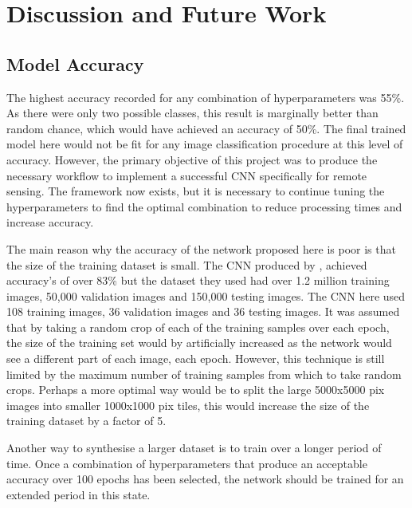 \chapter{Discussion and Future Work}

\section{Model Accuracy}
The highest accuracy recorded for any combination of hyperparameters was 55\%. As there were only two possible classes, this result is marginally better than random chance, which would have achieved an accuracy of 50\%. The final trained model here would not be fit for any image classification procedure at this level of accuracy. However, the primary objective of this project was to produce the necessary workflow to implement a successful CNN specifically for remote sensing. The framework now exists, but it is necessary to continue tuning the hyperparameters to find the optimal combination to reduce processing times and increase accuracy. 
\par
The main reason why the accuracy of the network proposed here is poor is that the size of the training dataset is small. The CNN produced by \citet{krizhevsky17}, achieved accuracy's of over 83\% but the dataset they used had over 1.2 million training images, 50,000 validation images and 150,000 testing images. The CNN here used 108 training images, 36 validation images and 36 testing images. It was assumed that by taking a random crop of each of the training samples over each epoch, the size of the training set would by artificially increased as the network would see a different part of each image, each epoch. However, this technique is still limited by the maximum number of training samples from which to take random crops. Perhaps a more optimal way would be to split the large 5000x5000 pix images into smaller 1000x1000 pix tiles, this would increase the size of the training dataset by a factor of 5. 
\par
Another way to synthesise a larger dataset is to train over a longer period of time. Once a combination of hyperparameters that produce an acceptable accuracy over 100 epochs has been selected, the network should be trained for an extended period in this state.  

